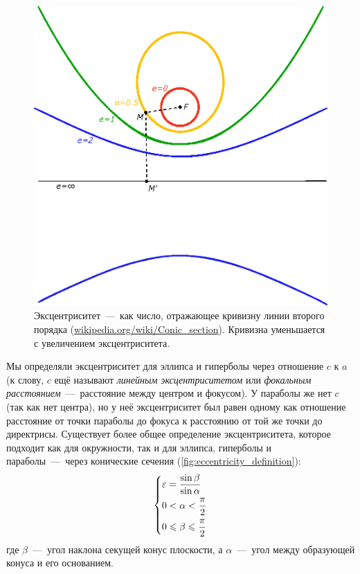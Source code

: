 \documentclass[a4paper,12pt]{article}
\begin{document}
  \begin{figure}[h]
    \centering
    
    \begin{minipage}[c]{0.4\textwidth}  %
      \includegraphics[width=\textwidth]{eccentricity}
    \end{minipage}\hfill
    \begin{minipage}[c]{0.55\textwidth}
      \caption{Эксцентриситет~---~как число, отражающее кривизну линии второго порядка (\href{https://en.wikipedia.org/wiki/Conic_section}{wikipedia.org/wiki/Conic\_section}). Кривизна уменьшается с увеличением эксцентриситета.}
      \label{fig:eccentricity}
    \end{minipage}
  \end{figure}
  
  
  Мы определяли эксцентриситет для эллипса и гиперболы через отношение $c$ к $a$ (к слову,  $c$ ещё называют \emph{линейным эксцентриситетом} или \emph{фокальным расстоянием}~---~расстояние между центром и фокусом).
  У параболы же нет $c$ (так как нет центра), но у неё эксцентриситет был равен одному как отношение расстояние от точки параболы до фокуса к расстоянию от той же точки до директрисы.
  Существует более общее определение эксцентриситета, которое подходит как для окружности, так и для эллипса, гиперболы и параболы~---~через конические сечения (\ref{fig:eccentricity_definition}):
  \[
    \left\{
      \begin{aligned}
        &\varepsilon = \frac{\sin \beta}{\sin \alpha}\\
        &0 < \alpha < \frac{\pi}{2}\\
        &0 \leqslant \beta \leqslant \frac{\pi}{2}
      \end{aligned}
    \right.
  \]
  где $\beta$~---~угол наклона секущей конус плоскости, а $\alpha$~---~угол между образующей конуса и его основанием.
  
\end{document}
